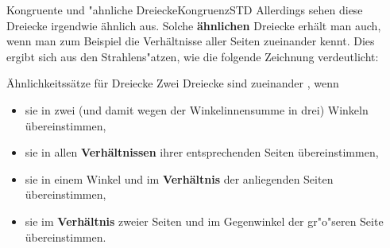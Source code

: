 \begin{MXContent}{Kongruente und "ahnliche Dreiecke}{Kongruenz}{STD}
Allerdings sehen diese Dreiecke irgendwie \"ahnlich aus. Solche 
\textbf{\"ahnlichen} Dreiecke erh\"alt man auch, wenn man zum Beispiel die 
Verh\"altnisse aller Seiten zueinander kennt. 
Dies ergibt sich aus den Strahlens"atzen, wie die folgende Zeichnung 
verdeutlicht: 
\begin{center}
\end{center}


\begin{MXInfo}{\"Ahnlichkeitss\"atze f\"ur Dreiecke}
Zwei Dreiecke sind zueinander , wenn
\begin{itemize}
 \item sie in zwei (und damit wegen der Winkelinnensumme in drei) 
   Winkeln \"ubereinstimmen,
 \item sie in allen \textbf{Verh\"altnissen} ihrer entsprechenden Seiten 
   \"ubereinstimmen,
 \item sie in einem Winkel und im \textbf{Verh\"altnis} der anliegenden 
   Seiten \"ubereinstimmen,
 \item sie im \textbf{Verh\"altnis} zweier Seiten und im Gegenwinkel der 
   gr"o"seren Seite \"ubereinstimmen.
\end{itemize}
\end{MXInfo}


\end{MXContent}
